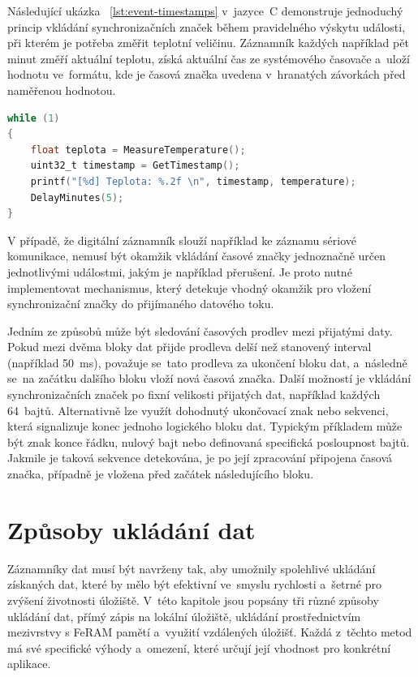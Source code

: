 Následující ukázka ~\ref{lst:event-timestamps} v~jazyce~C demonstruje jednoduchý princip vkládání synchronizačních značek během pravidelného výskytu události, při kterém je potřeba změřit teplotní veličinu. Záznamník každých například pět minut změří aktuální teplotu, získá aktuální čas ze systémového časovače a~uloží hodnotu ve~formátu, kde je časová značka uvedena v~hranatých závorkách před naměřenou hodnotou.~\cite{datalogger_implementation_temperature}

\begin{lstlisting}[language=C, caption={Vkládání časové značky zaznamenané události}, label={lst:event-timestamps}]
while (1)
{
    float teplota = MeasureTemperature();
    uint32_t timestamp = GetTimestamp();
    printf("[%d] Teplota: %.2f \n", timestamp, temperature);
    DelayMinutes(5);
}
\end{lstlisting}

V případě, že digitální záznamník slouží například ke záznamu sériové komunikace, nemusí být okamžik vkládání časové značky jednoznačně určen jednotlivými událostmi, jakým je například přerušení. Je proto nutné implementovat mechanismus, který detekuje vhodný okamžik pro vložení synchronizační značky do přijímaného datového toku.~\cite{serial_datalogger_timestamping, perny2008zarizeni_cas_znacky}

Jedním ze způsobů může být sledování časových prodlev mezi přijatými daty. Pokud mezi dvěma bloky dat přijde prodleva delší než stanovený interval (například 50~ms), považuje se~tato prodleva za ukončení bloku dat, a~následně se~na začátku dalšího bloku vloží nová časová značka. Další možností je vkládání synchronizačních značek po fixní velikosti přijatých dat, například každých 64~bajtů. Alternativně lze využít dohodnutý ukončovací znak nebo sekvenci, která signalizuje konec jednoho logického bloku dat. Typickým příkladem může být znak konce řádku, nulový bajt nebo definovaná specifická posloupnost bajtů. Jakmile je taková sekvence detekována, je po její zpracování připojena časová značka, případně je vložena před začátek následujícího bloku.~\cite{serial_datalogger_timestamping, perny2008zarizeni_cas_znacky}

\newpage

\section{Způsoby ukládání dat}
Záznamníky dat musí být navrženy tak, aby umožnily spolehlivé ukládání získaných dat, které by mělo být efektivní ve~smyslu rychlosti a~šetrné pro zvýšení životnosti úložiště. V~této kapitole jsou popsány tři různé způsoby ukládání dat, přímý zápis na lokální úložiště, ukládání prostřednictvím mezivrstvy s FeRAM pamětí a~využití vzdálených úložišť. Každá z~těchto metod má své specifické výhody a~omezení, které určují její vhodnost pro konkrétní aplikace.

